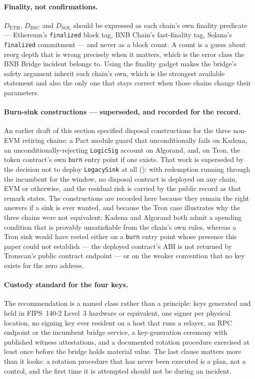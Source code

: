 \paragraph{Finality, not confirmations.} $D_{\mathrm{ETH}}$, $D_{\mathrm{BSC}}$ and
$D_{\mathrm{SOL}}$ should be expressed as each chain's own finality predicate --- Ethereum's
\texttt{finalized} block tag, BNB Chain's fast-finality tag, Solana's \texttt{finalized} commitment
--- and never as a block count. A count is a guess about reorg depth that is wrong precisely when it
matters, which is the error class the BNB Bridge incident belongs to. Using the finality gadget makes
the bridge's safety argument inherit each chain's own, which is the strongest available statement and
also the only one that stays correct when those chains change their parameters.

\paragraph{Burn-sink constructions --- superseded, and recorded for the record.} An earlier draft of
this section specified disposal constructions for the three non-EVM retiring chains: a Pact module
guard that unconditionally fails on Kadena, an unconditionally-rejecting \texttt{LogicSig} account on
Algorand, and, on Tron, the token contract's own \texttt{burn} entry point if one exists. That work is
superseded by the decision not to deploy \texttt{LegacySink} at all
(): with redemption running through the incumbent for the window, no
disposal contract is deployed on any chain, EVM or otherwise, and the residual risk is carried by the
public record as that remark states. The constructions are recorded here because they remain the
right answers if a sink is ever wanted, and because the Tron case illustrates why the three chains
were not equivalent: Kadena and Algorand both admit a spending condition that is provably
unsatisfiable from the chain's own rules, whereas a Tron sink would have rested either on a
\texttt{burn} entry point whose presence this paper could not establish --- the deployed contract's
ABI is not returned by Tronscan's public contract endpoint --- or on the weaker convention that no
key exists for the zero address.

\paragraph{Custody standard for the four keys.} The recommendation is a named class rather than a
principle: keys generated and held in FIPS~140-2 Level~3 hardware or equivalent, one signer per
physical location, no signing key ever resident on a host that runs a relayer, an RPC endpoint or the
incumbent bridge service, a key-generation ceremony with published witness attestations, and a
documented rotation procedure exercised at least once before the bridge holds material value. The
last clause matters more than it looks: a rotation procedure that has never been executed is a plan,
not a control, and the first time it is attempted should not be during an incident.

